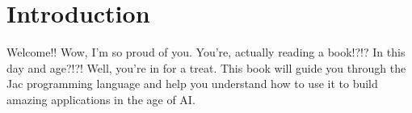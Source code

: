 \chapter{Introduction}

Welcome!! Wow, I'm so proud of you. You're, actually reading a book!?!? In this day and age?!?! Well, you're in for a treat. This book will guide you through the Jac programming language and help you understand how to use it to build amazing applications in the age of AI.